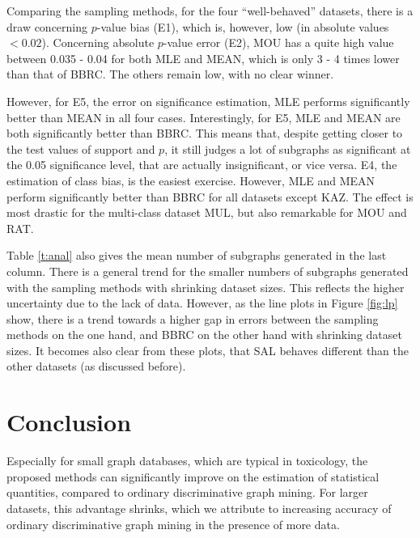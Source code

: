 \documentclass{sig-alternate}
\begin{document}
Comparing the sampling methods, for the four ``well-behaved'' datasets, there is a draw concerning $p$-value bias (E1), which is, however, low (in absolute values $<0.02$). Concerning absolute $p$-value error (E2), MOU has a quite high value between 0.035 - 0.04 for both MLE and MEAN, which is only 3 - 4 times lower than that of BBRC. The others remain low, with no clear winner. 

However, for E5, the error on significance estimation, MLE performs significantly better than MEAN in all four cases. Interestingly, for E5, MLE and MEAN are both significantly better than BBRC. This means that, despite getting closer to the test values of support and $p$, it still judges a lot of subgraphs as significant at the 0.05 significance level, that are actually insignificant, or vice versa.
E4, the estimation of class bias, is the easiest exercise. However, MLE and MEAN perform significantly better than BBRC for all datasets except KAZ. The effect is most drastic for the multi-class dataset MUL, but also remarkable for MOU and RAT.

Table \ref{t:anal} also gives the mean number of subgraphs generated in the last column. There is a general trend for the smaller numbers of subgraphs generated with the sampling methods with shrinking dataset sizes. This reflects the higher uncertainty due to the lack of data. However, as the line plots in Figure \ref{fig:lp} show, there is a trend towards a higher gap in errors between the sampling methods on the one hand, and BBRC on the other hand with shrinking dataset sizes. It becomes also clear from these plots, that SAL behaves different than the other datasets (as discussed before).


\section{Conclusion}
\label{s:Conclusion}
Especially for small graph databases, which are typical in toxicology, the
proposed methods can significantly improve on the estimation of statistical
quantities, compared to ordinary discriminative graph mining. For larger
datasets, this advantage shrinks, which we attribute to increasing accuracy of
ordinary discriminative graph mining in the presence of more data.




\end{document}
